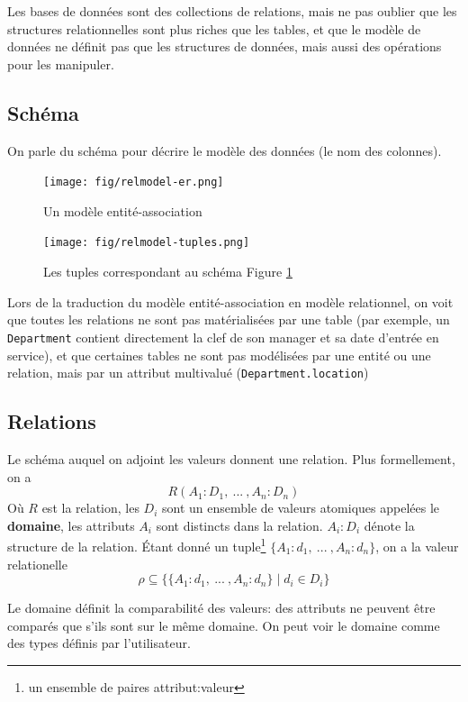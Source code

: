 \documentclass[a4paper]{article}
\begin{document}
Les bases de données sont des collections de relations, mais ne pas oublier que
les structures relationnelles sont plus riches que les tables, et que le modèle de 
données ne définit pas que les structures de données, mais aussi des opérations
pour les manipuler.

\subsection{Schéma}
On parle du schéma pour décrire le modèle des données (le nom des colonnes).

\begin{figure}[H]
    \center
    \texttt{[image: fig/relmodel-er.png]}
    \caption{\label{fig:relmodel-er}Un modèle entité-association}
\end{figure}
\begin{figure}[H]
    \center
    \texttt{[image: fig/relmodel-tuples.png]}
    \caption{Les tuples correspondant au schéma Figure \ref{fig:relmodel-er}}
\end{figure}

Lors de la traduction du modèle entité-association en modèle relationnel, on voit
que toutes les relations ne sont pas matérialisées par une table (par exemple,
un \texttt{Department} contient directement la clef de son manager et sa date d'entrée en service),
et que certaines tables ne sont pas modélisées par une entité ou une relation, mais
par un attribut multivalué (\texttt{Department.location})

\subsection{Relations}
Le schéma auquel on adjoint les valeurs donnent une relation. Plus formellement, on a
\begin{equation}
  R(A_1:D_1, ~ ... ~ , A_n:D_n)
\end{equation}
Où $R$ est la relation, les $D_i$ sont un ensemble de valeurs atomiques appelées le \textbf{domaine},
les attributs $A_i$ sont distincts dans la relation. $A_i : D_i$ dénote la structure de la relation.
\'Etant donné un tuple\footnote{un ensemble de paires attribut:valeur} $\{A_1: d_1, ~...~, A_n: d_n\}$, on a la valeur relationelle
\begin{equation}
  \rho \subseteq \{\{A_1:d_1, ~...~, A_n:d_n\} \mid d_i \in D_i\}
\end{equation}

Le domaine définit la comparabilité des valeurs: des attributs ne peuvent être comparés
que s'ils sont sur le même domaine. On peut voir le domaine comme des types définis par
l'utilisateur.
\end{document}
